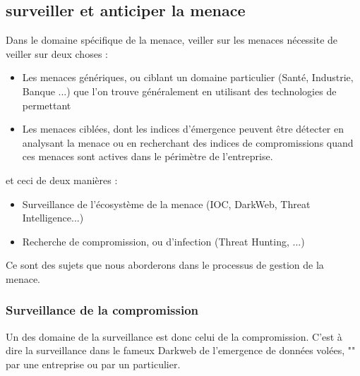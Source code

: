 \subsection{surveiller et anticiper la menace}


Dans le domaine spécifique de la menace, veiller sur les menaces nécessite de veiller sur deux choses : 

\begin{itemize}
  \item Les menaces génériques, ou ciblant un domaine  particulier (Santé, Industrie, Banque ...) que l'on trouve généralement en utilisant des technologies de  permettant 
  \item Les menaces ciblées, dont les indices d'émergence peuvent être détecter en analysant la menace ou  en recherchant des indices de compromissions quand ces menaces sont actives dans le périmètre de l'entreprise. 
\end{itemize}

et ceci de deux manières :

\begin{itemize}
  \item Surveillance de l'écosystème de la menace (IOC,  DarkWeb, Threat Intelligence...)
  \item Recherche de compromission, ou d'infection (Threat Hunting, ...) 
\end{itemize}

Ce sont des sujets que nous aborderons dans le processus de gestion de la menace.




\subsubsection{Surveillance de la compromission}

Un des domaine de la surveillance est donc celui de la compromission. C'est à dire la surveillance dans le fameux Darkweb de l'emergence de données volées, "" par une entreprise ou par un particulier.


